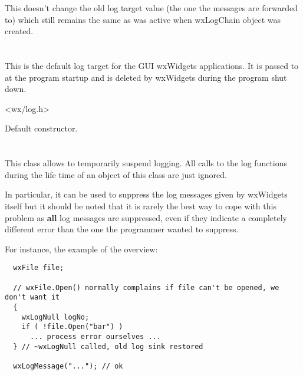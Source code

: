 This doesn't change the old log target value (the one the messages are
forwarded to) which still remains the same as was active when wxLogChain
object was created.


\section{}\label{wxloggui}

This is the default log target for the GUI wxWidgets applications. It is passed
to  at the program
startup and is deleted by wxWidgets during the program shut down.




<wx/log.h>




Default constructor.


\section{}\label{wxlognull}

This class allows to temporarily suspend logging. All calls to the log
functions during the life time of an object of this class are just ignored.

In particular, it can be used to suppress the log messages given by wxWidgets
itself but it should be noted that it is rarely the best way to cope with this
problem as {\bf all} log messages are suppressed, even if they indicate a
completely different error than the one the programmer wanted to suppress.

For instance, the example of the overview:

{\small
\begin{verbatim}
  wxFile file;

  // wxFile.Open() normally complains if file can't be opened, we don't want it
  {
    wxLogNull logNo;
    if ( !file.Open("bar") )
      ... process error ourselves ...
  } // ~wxLogNull called, old log sink restored

  wxLogMessage("..."); // ok
\end{verbatim}
}%

